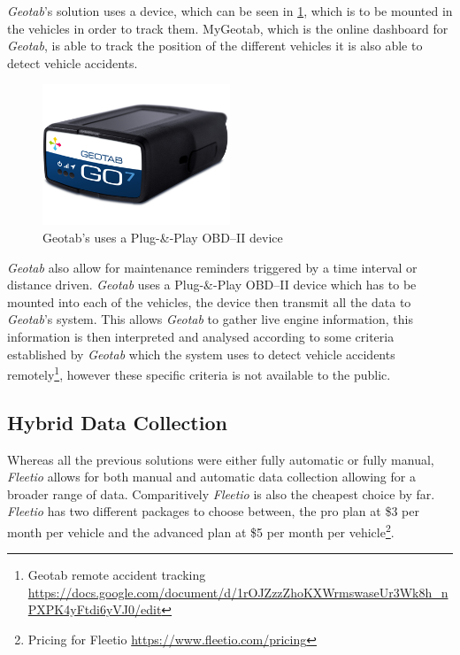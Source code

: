 \textit{Geotab}'s solution uses a device, which can be seen in \cref{fig:Geotab_device}, which is to be mounted in the vehicles in order to track them. MyGeotab, which is the online dashboard for \textit{Geotab}, is able to track the position of the different vehicles it is also able to detect vehicle accidents\cite{geotab}.
\begin{figure}[h!]
    \centering
    \includegraphics[width=0.5\textwidth]{img/geotab-device-side-view.png}
    \caption{Geotab's uses a Plug-\&-Play OBD--II device}
    \label{fig:Geotab_device}
\end{figure}

\textit{Geotab} also allow for maintenance reminders triggered by a time interval or distance driven.
\textit{Geotab} uses a Plug-\&-Play OBD--II device which has to be mounted into each of the vehicles, the device then transmit all the data to \textit{Geotab}'s system.
This allows \textit{Geotab} to gather live engine information, this information is then interpreted and analysed according to some criteria established by \textit{Geotab} which the system uses to detect vehicle accidents remotely\footnote{Geotab remote accident tracking \url{https://docs.google.com/document/d/1rOJZzzZhoKXWrmswaseUr3Wk8h_nPXPK4yFtdi6yVJ0/edit}}, however these specific criteria is not available to the public.
\subsection{Hybrid Data Collection}
Whereas all the previous solutions were either fully automatic or fully manual, \textit{Fleetio} allows for both manual and automatic data collection allowing for a broader range of data.
Comparitively \textit{Fleetio} is also the cheapest choice by far.
\textit{Fleetio} has two different packages to choose between, the pro plan at \$3 per month per vehicle and the advanced plan at \$5 per month per vehicle\footnote{Pricing for Fleetio \url{https://www.fleetio.com/pricing}}.
